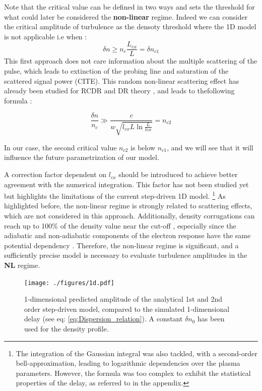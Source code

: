 \documentclass[11pt,openany]{report}
\begin{document}
\begin{multicols}{2}
    Note that the critical value can be defined in two ways \cite{SPR_Krutkin, PUT} and sets the threshold for what could later be considered the \textbf{non-linear} regime. Indeed we can consider the critical amplitude of turbulence as the densoty threshold where the 1D model is not applicable i.e when : $$\delta n \geq n_c \frac{L_{cx}}{L} = \delta n_{c 1}$$ This first approach does not care information about the multiple scattering of the pulse, which leads to extinction of the probing line and saturation of the scattered signal power (CITE). This random non-linear scattering effect has already been studied for RCDR and DR theory \cite{critical2}, and leads to thefollowing formula :

    $$ \frac{\delta n}{n_c} \gg  \frac{c}{w\sqrt{l_{cx}L\ln{\frac{L}{lcx}}}} = n_{c2}$$

    In our case, the second critical value $n_{c 2}$ is below $n_{c 1}$, and we will see that it will influence the future parametrization of our model.

    A correction factor dependent on $l_{cx}$ should be introduced to achieve better agreement with the numerical integration. This factor has not been studied yet but highlights the limitations of the current step-driven 1D model. \footnote{The integration of the Gaussian integral was also tackled, with a second-order bell-approximation, leading to logarithmic dependencies over the plasma parameters. However, the formula was too complex to exhibit the statistical properties of the delay, as referred to in the appendix.} As highlighted before, the non-linear regime is strongly related to scattering effects, which are not considered in this approach. Additionally, density corrugations can reach up to 100\% of the density value near the cut-off \cite{Krutkin_thesis,San_diego}, especially since the adiabatic and non-adiabatic components of the electron response have the same potential dependency \cite{San_diego}. Therefore, the non-linear regime is significant, and a sufficiently precise model is necessary to evaluate turbulence amplitudes in the \textbf{NL} regime.

    \begin{figure}[H]
        \centering
        \hspace*{-1.4cm}\texttt{[image: ./figures/1d.pdf]}
        \caption{1-dimensional predicted amplitude of the analytical 1st and 2nd order step-driven model, compared to the simulated 1-dimensional delay (see eq: \ref{eq:Dispersion_relation}). A constant \(\delta n_0\) has been used for the density profile.}
        \label{fig:std_delay}
    \end{figure}


\end{multicols}
\end{document}

